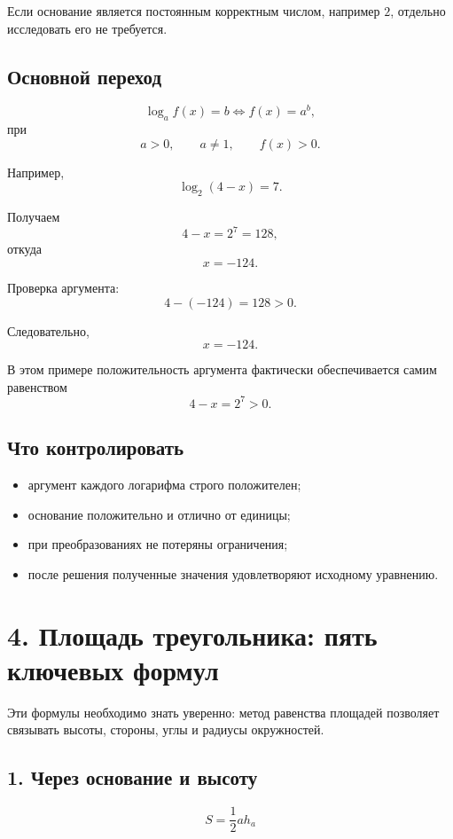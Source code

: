 \documentclass[a4paper,12pt]{article}
\begin{document}
Если основание является постоянным корректным числом, например \(2\), отдельно исследовать его не требуется.

\subsection*{Основной переход}

\[
\log_a f(x)=b
\iff
f(x)=a^b,
\]
при
\[
a>0,\qquad a\ne1,\qquad f(x)>0.
\]

Например,
\[
\log_2(4-x)=7.
\]

Получаем
\[
4-x=2^7=128,
\]
откуда
\[
x=-124.
\]

Проверка аргумента:
\[
4-(-124)=128>0.
\]

Следовательно,
\[
\boxed{x=-124}.
\]

В этом примере положительность аргумента фактически обеспечивается самим равенством
\[
4-x=2^7>0.
\]

\subsection*{Что контролировать}

\begin{itemize}
    \item аргумент каждого логарифма строго положителен;
    \item основание положительно и отлично от единицы;
    \item при преобразованиях не потеряны ограничения;
    \item после решения полученные значения удовлетворяют исходному уравнению.
\end{itemize}


\newpage
\section*{\textcolor{darkaccent}{4. Площадь треугольника: пять ключевых формул}}

Эти формулы необходимо знать уверенно: метод равенства площадей позволяет связывать высоты, стороны, углы и радиусы окружностей.

\subsection*{1. Через основание и высоту}

\[
\boxed{S=\frac12 ah_a}
\]
\end{document}
